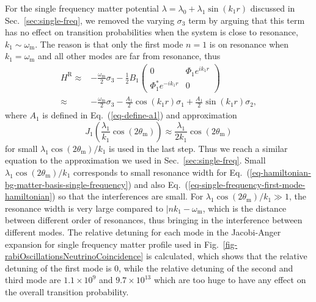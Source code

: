 \documentclass[%
reprint,
 amsmath,amssymb,
 aps,
]{revtex4-1}
\begin{document}
For the single frequency matter potential $\lambda = \lambda_0 + \lambda_1 \sin(k_1 r)$ discussed in Sec.~\ref{sec:single-freq}, we removed the varying $\sigma_3$ term by arguing that this term has no effect on transition probabilities when the system is close to resonance, $k_1 \sim \omega_{\mathrm m}$. The reason is that only the first mode $n=1$ is on resonance when $k_1=\omega_{\mathrm m}$ and all other modes are far from resonance, thus
\begin{align}
H^{\mathrm R} \approx & -\frac{\omega_{\mathrm m}}{2}\sigma_3 - \frac{1}{2} B_1 \begin{pmatrix}
0 & \Phi_1 e^{i k_1 r} \\
\Phi_1^* e^{-ik_1r} & 0
\end{pmatrix}\label{eq-single-frequency-first-mode-hamiltonian} \\
\approx & -\frac{\omega_{\mathrm m}}{2} \sigma_3 - \frac{A_1}{2} \cos(k_1 r) \sigma_1 + \frac{A_1}{2} \sin(k_1 r) \sigma_2\nonumber,
\end{align}
where $A_1$ is defined in Eq.~(\ref{eq-define-a1}) and approximation
\begin{equation*}
J_1\left( \frac{\lambda_1}{k_1}\cos (2\theta_{\mathrm m}) \right) \approx \frac{\lambda_1}{2k_1}\cos (2\theta_{\mathrm m})
\end{equation*}
for small $\lambda_1\cos(2\theta_{\mathrm m})/k_1$ is used in the last step. Thus we reach a similar equation to the approximation we used in Sec.~\ref{sec:single-freq}. Small $\lambda_1\cos(2\theta_{\mathrm m})/k_1$ corresponds to small resonance width for Eq.~(\ref{eq-hamiltonian-bg-matter-basis-single-frequency}) and also Eq.~(\ref{eq-single-frequency-first-mode-hamiltonian}) so that the interferences are small. For $\lambda_1 \cos(2\theta_{\mathrm{m}})/k_1\gg 1$, the resonance width is very large compared to $\lvert n k_1 - \omega_{\mathrm{m}}$, which is the distance between different order of resonances, thus bringing in the interference between different modes. The relative detuning for each mode in the Jacobi-Anger expansion for single frequency matter profile used in Fig.~\ref{fig-rabiOscillationsNeutrinoCoincidence} is calculated, which shows that the relative detuning of the first mode is $0$, while the relative detuning of the second and third mode are $1.1\times 10^9$ and $9.7\times 10^{13}$ which are too huge to have any effect on the overall transition probability.
\end{document}
